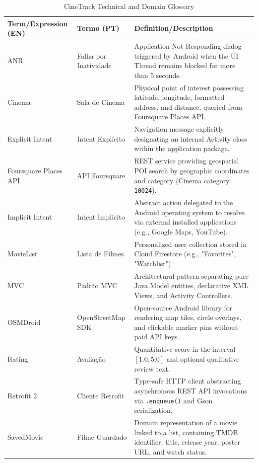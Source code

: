 \documentclass[runningheads,a4paper]{llncs}
\begin{document}
\begin{table}[H]
\caption{CineTrack Technical and Domain Glossary}
\label{tab:glossary}
\centering\scriptsize
\begin{tabular}{@{}>{\raggedright\arraybackslash}p{2.8cm}
                    >{\raggedright\arraybackslash}p{2.8cm}
                    >{\raggedright\arraybackslash}p{6.2cm}@{}}
\hline
\textbf{Term/Expression (EN)} & \textbf{Termo (PT)} & \textbf{Definition/Description} \\
\hline
ANR & Falha por Inatividade & Application Not Responding dialog triggered by Android when the UI Thread remains blocked for more than 5 seconds. \\[3pt]
Cinema & Sala de Cinema & Physical point of interest possessing latitude, longitude, formatted address, and distance, queried from Foursquare Places API. \\[3pt]
Explicit Intent & Intent Explícito & Navigation message explicitly designating an internal Activity class within the application package. \\[3pt]
Foursquare Places API & API Foursquare & REST service providing geospatial POI search by geographic coordinates and category (Cinema category \texttt{10024}). \\[3pt]
Implicit Intent & Intent Implícito & Abstract action delegated to the Android operating system to resolve via external installed applications (e.g., Google Maps, YouTube). \\[3pt]
MovieList & Lista de Filmes & Personalized user collection stored in Cloud Firestore (e.g., "Favorites", "Watchlist"). \\[3pt]
MVC & Padrão MVC & Architectural pattern separating pure Java Model entities, declarative XML Views, and Activity Controllers. \\[3pt]
OSMDroid & OpenStreetMap SDK & Open-source Android library for rendering map tiles, circle overlays, and clickable marker pins without paid API keys. \\[3pt]
Rating & Avaliação & Quantitative score in the interval $[1.0, 5.0]$ and optional qualitative review text. \\[3pt]
Retrofit 2 & Cliente Retrofit & Type-safe HTTP client abstracting asynchronous REST API invocations via \texttt{.enqueue()} and Gson serialization. \\[3pt]
SavedMovie & Filme Guardado & Domain representation of a movie linked to a list, containing TMDB identifier, title, release year, poster URL, and watch status. \\[3pt]

\end{tabular}
\end{table}
\end{document}
